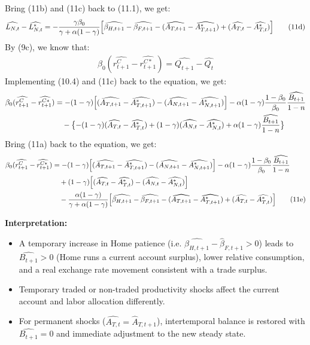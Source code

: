 \documentclass[a4paper,12pt]{article} %
\theoremstyle{nonitalic}
\begin{document}
Bring (11b) and (11c) back to (11.1), we get:
\begin{gather*}
    \widehat{L_{N,t}} - \widehat{L_{N,t}^*} = - \frac{\gamma \beta_0}{\gamma + \alpha(1-\gamma)} \Bigl[ \widehat{\beta_{H,t+1}} - \widehat{\beta_{F,t+1}} - (\widehat{A_{T,t+1}} - \widehat{A_{T,t+1}^*}) + (\widehat{A_{T,t}} - \widehat{A_{T,t}^*}) \Bigr] \tag{11d}
\end{gather*}
By (9c), we know that:
\begin{gather*}
    \beta_0 (\widehat{r_{t+1}^C} - \widehat{r_{t+1}^{C*}}) = \widehat{Q_{t+1}} - \widehat{Q_t}
\end{gather*}
Implementing (10.4) and (11c) back to the equation, we get:
\begin{align*}
    \beta_0 (\widehat{r_{t+1}^C} - \widehat{r_{t+1}^{C*}}) &= -(1-\gamma) \Bigl[ (\widehat{A_{T,t+1}} - \widehat{A_{T,t+1}^*}) - (\widehat{A_{N,t+1}} - \widehat{A_{N,t+1}^*}) \Bigr] - \alpha (1-\gamma) \frac{1-\beta_0}{\beta_0} \frac{\widehat{B_{t+1}}}{1-n} \\
    & \quad - \bigl\{ -(1-\gamma) (\widehat{A_{T,t}} - \widehat{A_{T,t}^*}) + (1-\gamma) (\widehat{A_{N,t}} - \widehat{A_{N,t}^*}) + \alpha (1-\gamma) \frac{\widehat{B_{t+1}}}{1-n} \bigr\}
\end{align*}
Bring (11a) back to the equation, we get:
\begin{align*}
    \beta_0 (\widehat{r_{t+1}^C} - \widehat{r_{t+1}^{C*}}) &= -(1-\gamma) \Bigl[ (\widehat{A_{T,t+1}} - \widehat{A_{T,t+1}^*}) - (\widehat{A_{N,t+1}} - \widehat{A_{N,t+1}^*}) \Bigr] - \alpha (1-\gamma) \frac{1-\beta_0}{\beta_0} \frac{\widehat{B_{t+1}}}{1-n} \\
    & \quad + (1-\gamma) \Bigl[(\widehat{A_{T,t}} - \widehat{A_{T,t}^*}) - (\widehat{A_{N,t}} - \widehat{A_{N,t}^*}) \Bigr] \\
    & \quad - \frac{\alpha (1-\gamma)}{\gamma + \alpha(1-\gamma)} \Bigl[ \widehat{\beta_{H,t+1}} - \widehat{\beta_{F,t+1}} - (\widehat{A_{T,t+1}} - \widehat{A_{T,t+1}^*}) + (\widehat{A_{T,t}} - \widehat{A_{T,t}^*}) \Bigr] \tag{11e}
\end{align*}

\textbf{Interpretation:}
\begin{itemize}
    \item A temporary increase in Home patience (i.e. $ \widehat{\beta_{H,t+1}}-\hat{\beta}_{F,t+1} > 0 $) leads to $ \widehat{B_{t+1}}>0 $ (Home runs a current account surplus), lower relative consumption, and a real exchange rate movement consistent with a trade surplus.
    \item Temporary traded or non-traded productivity shocks affect the current account and labor allocation differently.
    \item For permanent shocks ($ \widehat{A_{T,t}}=\hat{A}_{T,t+1} $), intertemporal balance is restored with $ \widehat{B_{t+1}}=0 $ and immediate adjustment to the new steady state.
\end{itemize}
\end{document}
